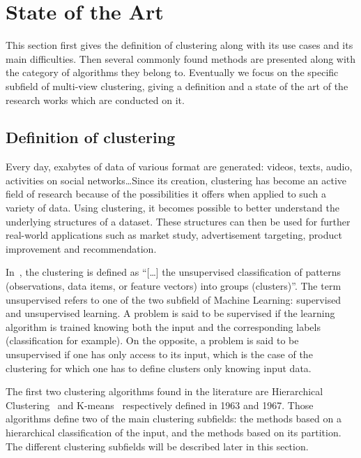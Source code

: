 %
\chapter{State of the Art}
This section first gives the definition of clustering along with its use cases and its main difficulties. Then several commonly found methods are presented along with the category of algorithms they belong to. Eventually we focus on the specific subfield of multi-view clustering, giving a definition and a state of the art of the research works which are conducted on it.

    \section{Definition of clustering}
    Every day, exabytes of data of various format are generated: videos, texts, audio, activities on social networks\ldots Since its creation, clustering has become an active field of research because of the possibilities it offers when applied to such a variety of data. Using clustering, it becomes possible to better understand the underlying structures of a dataset. These structures can then be used for further real-world applications such as market study, advertisement targeting, product improvement and recommendation.

    In~\cite{jain1999data}, the clustering is defined as ``[\ldots] the unsupervised classification of patterns (observations, data items, or feature vectors) into groups (clusters)''. The term unsupervised refers to one of the two subfield of Machine Learning: supervised and unsupervised learning. A problem is said to be supervised if the learning algorithm is trained knowing both the input and the corresponding labels (classification for example). On the opposite, a problem is said to be unsupervised if one has only access to its input, which is the case of the clustering for which one has to define clusters only knowing input data.  

    The first two clustering algorithms found in the literature are Hierarchical Clustering~\cite{ward1963hierarchical} and K-means~\cite{macqueen1967some} respectively defined in 1963 and 1967. Those algorithms define two of the main clustering subfields: the methods based on a hierarchical classification of the input, and the methods based on its partition. The different clustering subfields will be described later in this section.

